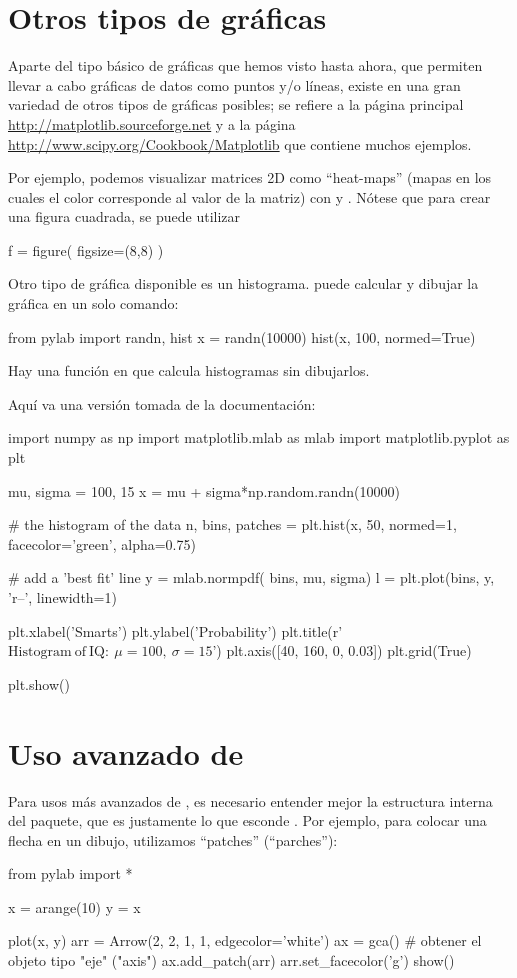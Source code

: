 \section{Otros tipos de gráficas}
Aparte del tipo básico de gráficas que hemos visto hasta ahora, que permiten llevar a cabo gráficas de datos como puntos y/o líneas, existe en  una gran variedad de otros tipos de gráficas posibles; se refiere a la página principal \url{http://matplotlib.sourceforge.net} y a la página 
\url{http://www.scipy.org/Cookbook/Matplotlib} que contiene muchos ejemplos.

Por ejemplo, podemos visualizar matrices 2D como ``heat-maps'' (mapas en los cuales el color corresponde al valor de la matriz) con  y . Nótese que para crear una figura cuadrada, se puede utilizar
\begin{python}
f = figure( figsize=(8,8) )
\end{python}

Otro tipo de gráfica disponible es un histograma.  puede calcular y dibujar la gráfica en un solo comando:
\begin{python}
from pylab import randn, hist
x = randn(10000)
hist(x, 100, normed=True)
\end{python}
Hay una función  en  que calcula histogramas sin dibujarlos.

Aquí va una versión tomada de la documentación:
\begin{python}
import numpy as np
import matplotlib.mlab as mlab
import matplotlib.pyplot as plt

mu, sigma = 100, 15
x = mu + sigma*np.random.randn(10000)

# the histogram of the data
n, bins, patches = plt.hist(x, 50, normed=1, facecolor='green', alpha=0.75)

# add a 'best fit' line
y = mlab.normpdf( bins, mu, sigma)
l = plt.plot(bins, y, 'r--', linewidth=1)

plt.xlabel('Smarts')
plt.ylabel('Probability')
plt.title(r'$\mathrm{Histogram\ of\ IQ:}\ \mu=100,\ \sigma=15$')
plt.axis([40, 160, 0, 0.03])
plt.grid(True)

plt.show()
\end{python}



\section{Uso avanzado de }
Para usos más avanzados de , es necesario entender mejor la estructura interna del paquete, que es justamente lo que esconde .  Por ejemplo, para colocar una flecha en un dibujo, utilizamos ``patches'' (``parches''):
\begin{python}
from pylab import *
   
x = arange(10)
y = x

plot(x, y)
arr = Arrow(2, 2, 1, 1, edgecolor='white')
ax = gca()   # obtener el objeto tipo "eje" ("axis")
ax.add_patch(arr)
arr.set_facecolor('g')
show()
\end{python}


